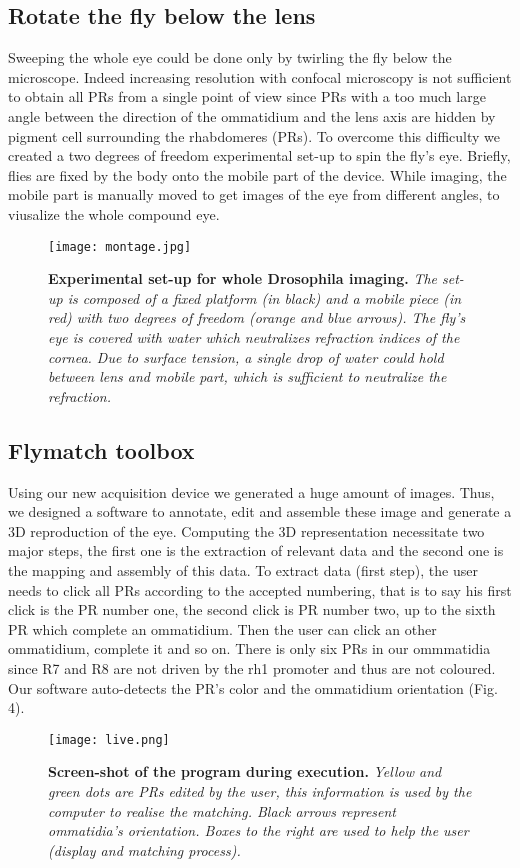 \documentclass{article}
\begin{document}
\subsection{Rotate the fly below the lens}
Sweeping the whole eye could be done only by twirling the fly below the microscope. Indeed increasing resolution with confocal microscopy is not sufficient to obtain all PRs from a single point of view since PRs with a too much large angle between the direction of the ommatidium and the lens axis are hidden by pigment cell surrounding the rhabdomeres (PRs).
To overcome this difficulty we created a two degrees of freedom experimental set-up to spin the fly's eye. Briefly, flies are fixed by the body onto the mobile part of the device. While imaging, the mobile part is manually moved to get images of the eye from different angles, to viusalize the whole compound eye.

	\begin{figure}[H]
	  \centering
  	\texttt{[image: montage.jpg]}
  	\caption{\textbf{Experimental set-up for whole Drosophila imaging.} \textsl{The set-up is composed of a fixed platform (in black) and a mobile piece (in red) with two degrees of freedom (orange and blue arrows). The fly's eye is covered with water which neutralizes refraction indices of the cornea. Due to surface tension, a single drop of water could hold between lens and mobile part, which is sufficient to neutralize the refraction.}}
	\end{figure}

\subsection{Flymatch toolbox}
Using our new acquisition device we generated a huge amount of images. Thus, we designed a software to annotate, edit and assemble these image and generate a 3D reproduction of the eye. Computing the 3D representation necessitate two major steps, the first one is the extraction of relevant data and the second one is the mapping and assembly of this data.
To extract data (first step), the user needs to click all PRs according to the accepted numbering, that is to say his first click is the PR number one, the second click is PR number two, up to the sixth PR which complete an ommatidium. Then the user can click an other ommatidium, complete it and so on. There is only six PRs in our ommmatidia since R7 and R8 are not driven by the rh1 promoter and thus are not coloured.
Our software auto-detects the PR's color and the ommatidium orientation (Fig. 4).
\begin{figure}[H]
	  \centering
  	\texttt{[image: live.png]}
  	\caption{\textbf{Screen-shot of the program during execution.} \textsl{Yellow and green dots are PRs edited by the user, this information is used by the computer to realise the matching. Black arrows represent ommatidia's orientation. Boxes to the right are used to help the user (display and matching process).}}
	\end{figure}
\end{document}
